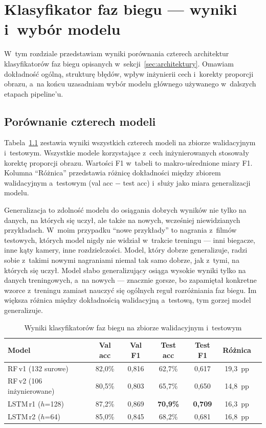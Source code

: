 \chapter{Klasyfikator faz biegu --- wyniki i~wybór modelu}
\label{ch:klasyfikator}

W~tym rozdziale przedstawiam wyniki porównania czterech architektur klasyfikatorów faz biegu opisanych w~sekcji~\ref{sec:architektury}. Omawiam dokładność ogólną, strukturę błędów, wpływ inżynierii cech i~korekty proporcji obrazu, a~na końcu uzasadniam wybór modelu głównego używanego w~dalszych etapach pipeline'u.

\section{Porównanie czterech modeli}
\label{sec:porownanie-modeli}

Tabela~\ref{tab:model-results} zestawia wyniki wszystkich czterech modeli na zbiorze walidacyjnym i~testowym. Wszystkie modele korzystające z~cech inżynierowanych stosowały korektę proporcji obrazu. Wartości F1 w~tabeli to makro-uśrednione miary F1. Kolumna ``Różnica'' przedstawia różnicę dokładności między zbiorem walidacyjnym a~testowym (val acc $-$ test acc) i~służy jako miara generalizacji modelu.

Generalizacja to zdolność modelu do osiągania dobrych wyników nie tylko na danych, na których się uczył, ale także na nowych, wcześniej niewidzianych przykładach. W~moim przypadku ``nowe przykłady'' to nagrania z~filmów testowych, których model nigdy nie widział w~trakcie treningu --- inni biegacze, inne kąty kamery, inne rozdzielczości. Model, który dobrze generalizuje, radzi sobie z~takimi nowymi nagraniami niemal tak samo dobrze, jak z~tymi, na których się uczył. Model słabo generalizujący osiąga wysokie wyniki tylko na danych treningowych, a~na nowych --- znacznie gorsze, bo zapamiętał konkretne wzorce z~treningu zamiast nauczyć się ogólnych reguł rozróżniania faz biegu. Im większa różnica między dokładnością walidacyjną a~testową, tym gorzej model generalizuje.

\begin{table}[htbp]
\centering
\caption{Wyniki klasyfikatorów faz biegu na zbiorze walidacyjnym i~testowym}
\label{tab:model-results}
\small
\begin{tabular}{lcccccc}
\hline
\textbf{Model} & \textbf{Val acc} & \textbf{Val F1} & \textbf{Test acc} & \textbf{Test F1} & \textbf{Różnica} \\
\hline
RF\,v1 (132 surowe)         & 82{,}0\% & 0{,}816 & 62{,}7\% & 0{,}617 & 19{,}3~pp \\
RF\,v2 (106 inżynierowane)  & 80{,}5\% & 0{,}803 & 65{,}7\% & 0{,}650 & 14{,}8~pp \\
LSTM\,r1 ($h$=128)   & 87{,}2\% & 0{,}869 & \textbf{70{,}9\%} & \textbf{0{,}709} & 16{,}3~pp \\
LSTM\,r2 ($h$=64)    & 85{,}0\% & 0{,}845 & 68{,}2\% & 0{,}681 & 16{,}8~pp \\
\hline
\end{tabular}
\end{table}

